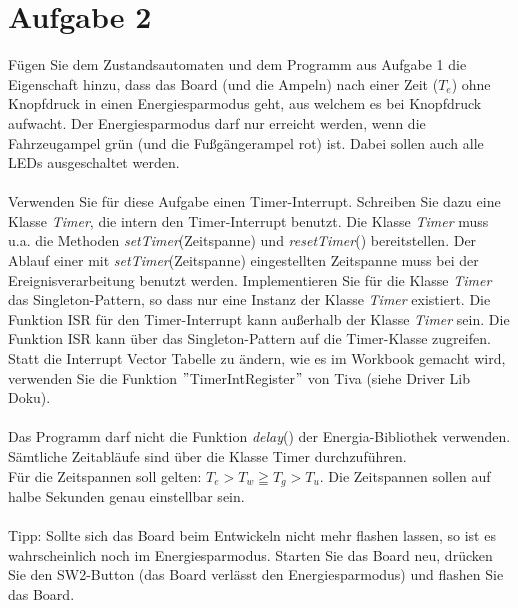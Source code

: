 \section{Aufgabe 2}
Fügen Sie dem Zustandsautomaten und dem Programm aus Aufgabe 1 die Eigenschaft hinzu, dass das Board (und die Ampeln) nach einer Zeit ($T_e$) ohne Knopfdruck in einen Energiesparmodus geht, aus welchem es bei Knopfdruck aufwacht. Der Energiesparmodus darf nur erreicht werden, wenn die Fahrzeugampel grün (und die Fu\ss{}gängerampel rot) ist. Dabei sollen auch alle LEDs ausgeschaltet werden.\\ \\
Verwenden Sie für diese Aufgabe einen Timer-Interrupt. Schreiben Sie dazu eine Klasse \textit{Timer}, die intern den Timer-Interrupt benutzt. Die Klasse \textit{Timer} muss u.a. die Methoden \textit{setTimer}(Zeitspanne) und \textit{resetTimer}() bereitstellen. Der Ablauf einer mit \textit{setTimer}(Zeitspanne) eingestellten Zeitspanne muss bei der Ereignisverarbeitung benutzt werden. Implementieren Sie für die Klasse \textit{Timer} das Singleton-Pattern, so dass nur eine Instanz der Klasse \textit{Timer} existiert. Die Funktion ISR für den Timer-Interrupt kann au\ss{}erhalb der Klasse \textit{Timer} sein. Die Funktion ISR kann über das Singleton-Pattern auf die Timer-Klasse zugreifen.\\
Statt die Interrupt Vector Tabelle zu ändern, wie es im Workbook gemacht wird, verwenden Sie die Funktion $"$TimerIntRegister$"$ von Tiva (siehe Driver Lib Doku).\\ \\
Das Programm darf nicht die Funktion \textit{delay}() der Energia-Bibliothek verwenden. Sämtliche Zeitabläufe sind über die Klasse Timer durchzuführen.\\
Für die Zeitspannen soll gelten: $T_e > T_w \geqq T_g > T_u$. Die Zeitspannen sollen auf halbe Sekunden genau einstellbar sein.\\ \\
Tipp: Sollte sich das Board beim Entwickeln nicht mehr flashen lassen, so ist es wahrscheinlich noch im Energiesparmodus. Starten Sie das Board neu, drücken Sie den SW2-Button (das Board verlässt den Energiesparmodus) und flashen Sie das Board.